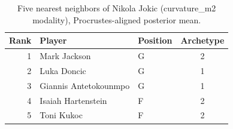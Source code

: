 \begin{table}[htbp]
  \centering\small
  \begin{tabular}{rllc}
    \toprule
    Rank & Player & Position & Archetype \\
    \midrule
    1 & Mark Jackson & G & 2 \\
    2 & Luka Doncic & G & 1 \\
    3 & Giannis Antetokounmpo & G & 1 \\
    4 & Isaiah Hartenstein & F & 2 \\
    5 & Toni Kukoc & F & 2 \\
    \bottomrule
  \end{tabular}
  \caption{Five nearest neighbors of Nikola Jokic (curvature_m2 modality), Procrustes-aligned posterior mean.}
  \label{tab:Nikola_Jokic_neighbors_curvature_m2}
\end{table}

